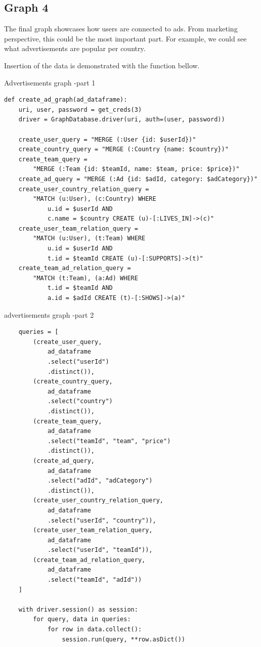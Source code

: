 \subsection{Graph 4}\label{Graph4}

The final graph showcases how users are connected to ads. From marketing perspective, this could be the most important part. For example, we could see what advertisements are popular per country.

Insertion of the data is demonstrated with the function bellow.
\begin{listing}[H]
\caption{Advertisements graph -part 1}
\begin{verbatim}
def create_ad_graph(ad_dataframe):
    uri, user, password = get_creds(3)
    driver = GraphDatabase.driver(uri, auth=(user, password))

    create_user_query = "MERGE (:User {id: $userId})"
    create_country_query = "MERGE (:Country {name: $country})"
    create_team_query = 
        "MERGE (:Team {id: $teamId, name: $team, price: $price})"
    create_ad_query = "MERGE (:Ad {id: $adId, category: $adCategory})"
    create_user_country_relation_query = 
        "MATCH (u:User), (c:Country) WHERE 
            u.id = $userId AND 
            c.name = $country CREATE (u)-[:LIVES_IN]->(c)"
    create_user_team_relation_query = 
        "MATCH (u:User), (t:Team) WHERE 
            u.id = $userId AND 
            t.id = $teamId CREATE (u)-[:SUPPORTS]->(t)"
    create_team_ad_relation_query = 
        "MATCH (t:Team), (a:Ad) WHERE 
            t.id = $teamId AND 
            a.id = $adId CREATE (t)-[:SHOWS]->(a)"
\end{verbatim}
\end{listing}

\begin{listing}[H]
\caption{advertisements graph -part 2}
\begin{verbatim}
    queries = [
        (create_user_query, 
            ad_dataframe
            .select("userId")
            .distinct()),
        (create_country_query, 
            ad_dataframe
            .select("country")
            .distinct()),
        (create_team_query, 
            ad_dataframe
            .select("teamId", "team", "price")
            .distinct()),
        (create_ad_query, 
            ad_dataframe
            .select("adId", "adCategory")
            .distinct()),
        (create_user_country_relation_query, 
            ad_dataframe
            .select("userId", "country")),
        (create_user_team_relation_query, 
            ad_dataframe
            .select("userId", "teamId")),
        (create_team_ad_relation_query, 
            ad_dataframe
            .select("teamId", "adId"))
    ]

    with driver.session() as session:
        for query, data in queries:
            for row in data.collect():
                session.run(query, **row.asDict())
\end{verbatim}
\end{listing}

